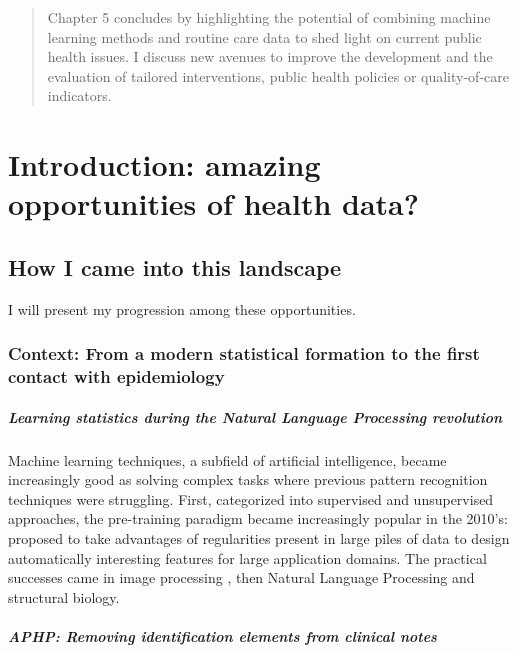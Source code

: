 \documentclass{report}
\begin{document}
\begin{abstract}
  Chapter 5 concludes by highlighting the potential of combining machine
  learning methods and routine care data to shed light on current public health
  issues. I discuss new avenues to improve the development and the evaluation of
  tailored interventions, public health policies or quality-of-care indicators.

\end{abstract}

\tableofcontents




\chapter{Introduction: amazing opportunities of health data?}\label{chap:intro}
\section{How I came into this landscape}\label{sec:intro:landscape}

I will present my progression among these opportunities.

\subsection{Context: From a modern statistical formation to the first contact with epidemiology}\label{subsec:intro:context}

\paragraph{Learning statistics during the Natural Language Processing revolution}

Machine learning techniques, a subfield of artificial intelligence, became
increasingly good as solving complex tasks where previous pattern recognition
techniques were struggling. First, categorized into supervised and unsupervised
approaches, the pre-training paradigm became increasingly popular in the 2010's:
\cite{halevy2009unreasonable} proposed to take advantages of regularities
present in large piles of data to design automatically interesting features for
large application domains. The practical successes came in image processing
\citep{}, then Natural Language Processing \citep{} and structural biology.
%

\paragraph{APHP: Removing identification elements from clinical notes}
\end{document}
